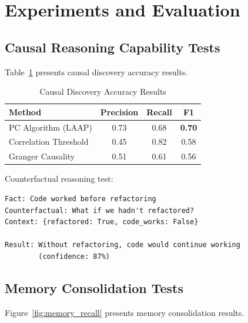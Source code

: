 \documentclass[10pt,twocolumn,letterpaper]{article}
\begin{document}
\section{Experiments and Evaluation}
\label{sec:experiments}

\subsection{Causal Reasoning Capability Tests}
\label{ssec:causal_tests}

Table~\ref{tab:causal_results} presents causal discovery accuracy results.

\begin{table}[t]
    \caption{Causal Discovery Accuracy Results}
    \label{tab:causal_results}
    \centering
    \begin{small}
    \begin{tabular}{lccc}
        \toprule
        \textbf{Method} & \textbf{Precision} & \textbf{Recall} & \textbf{F1} \\
        \midrule
        PC Algorithm (LAAP) & 0.73 & 0.68 & \textbf{0.70} \\
        Correlation Threshold & 0.45 & 0.82 & 0.58 \\
        Granger Causality & 0.51 & 0.61 & 0.56 \\
        \bottomrule
    \end{tabular}
    \end{small}
    \vspace{-1em}
\end{table}

Counterfactual reasoning test:
\begin{verbatim}
Fact: Code worked before refactoring
Counterfactual: What if we hadn't refactored?
Context: {refactored: True, code_works: False}

Result: Without refactoring, code would continue working
        (confidence: 87%)
\end{verbatim}

\subsection{Memory Consolidation Tests}
\label{ssec:memory_tests}

Figure~\ref{fig:memory_recall} presents memory consolidation results.
\end{document}
